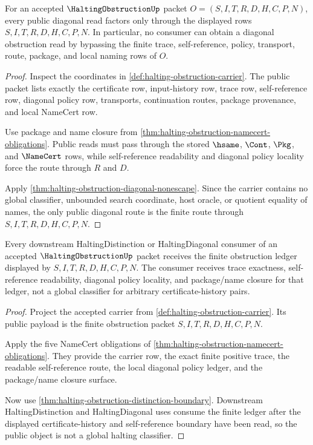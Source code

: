 \begin{theorem}
\label{thm:halting-obstruction-finite-route-nonescape}
For an accepted $\HaltingObstructionUp$ packet $O=(S,I,T,R,D,H,C,P,N)$, every public diagonal read factors only through the displayed rows $S,I,T,R,D,H,C,P,N$. In particular, no consumer can obtain a diagonal obstruction read by bypassing the finite trace, self-reference, policy, transport, route, package, and local naming rows of $O$.
\end{theorem}
\begin{proof}
Inspect the coordinates in \autoref{def:halting-obstruction-carrier}. The public packet lists exactly the certificate row, input-history row, trace row, self-reference row, diagonal policy row, transports, continuation routes, package provenance, and local NameCert row.

Use package and name closure from \autoref{thm:halting-obstruction-namecert-obligations}. Public reads must pass through the stored $\hsame$, $\Cont$, $\Pkg$, and $\NameCert$ rows, while self-reference readability and diagonal policy locality force the route through $R$ and $D$.

Apply \autoref{thm:halting-obstruction-diagonal-nonescape}. Since the carrier contains no global classifier, unbounded search coordinate, host oracle, or quotient equality of names, the only public diagonal route is the finite route through $S,I,T,R,D,H,C,P,N$.
\end{proof}

\begin{theorem}
\label{thm:halting-obstruction-public-read-boundary}
Every downstream HaltingDistinction or HaltingDiagonal consumer of an accepted $\HaltingObstructionUp$ packet receives the finite obstruction ledger displayed by $S,I,T,R,D,H,C,P,N$. The consumer receives trace exactness, self-reference readability, diagonal policy locality, and package/name closure for that ledger, not a global classifier for arbitrary certificate-history pairs.
\end{theorem}
\begin{proof}
Project the accepted carrier from \autoref{def:halting-obstruction-carrier}. Its public payload is the finite obstruction packet $S,I,T,R,D,H,C,P,N$.

Apply the five NameCert obligations of \autoref{thm:halting-obstruction-namecert-obligations}. They provide the carrier row, the exact finite positive trace, the readable self-reference route, the local diagonal policy ledger, and the package/name closure surface.

Now use \autoref{thm:halting-obstruction-distinction-boundary}. Downstream HaltingDistinction and HaltingDiagonal uses consume the finite ledger after the displayed certificate-history and self-reference boundary have been read, so the public object is not a global halting classifier.
\end{proof}


